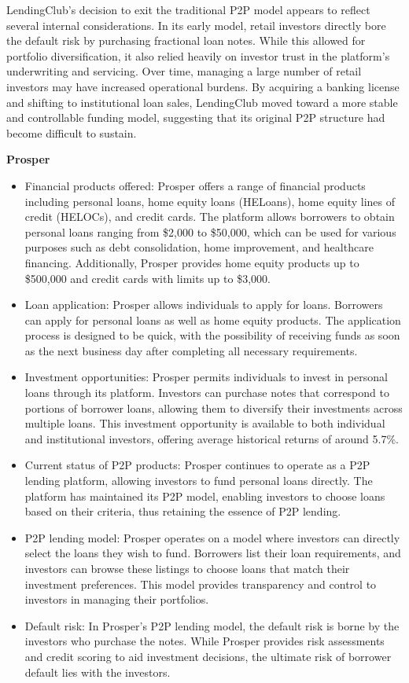 \documentclass[pdflatex,sn-apa]{sn-jnl}%
\theoremstyle{thmstyleone}%
\theoremstyle{thmstyletwo}%
\theoremstyle{thmstylethree}%
\begin{document}
LendingClub’s decision to exit the traditional P2P model appears to reflect several internal considerations. In its early model, retail investors directly bore the default risk by purchasing fractional loan notes. While this allowed for portfolio diversification, it also relied heavily on investor trust in the platform’s underwriting and servicing. Over time, managing a large number of retail investors may have increased operational burdens. By acquiring a banking license and shifting to institutional loan sales, LendingClub moved toward a more stable and controllable funding model, suggesting that its original P2P structure had become difficult to sustain.

\vspace{1\baselineskip}
\textbf{Prosper}
\begin{itemize} 
\item Financial products offered: Prosper offers a range of financial products including personal loans, home equity loans (HELoans), home equity lines of credit (HELOCs), and credit cards. The platform allows borrowers to obtain personal loans ranging from \$2,000 to \$50,000, which can be used for various purposes such as debt consolidation, home improvement, and healthcare financing. Additionally, Prosper provides home equity products up to \$500,000 and credit cards with limits up to \$3,000.
\item Loan application: Prosper allows individuals to apply for loans. Borrowers can apply for personal loans as well as home equity products. The application process is designed to be quick, with the possibility of receiving funds as soon as the next business day after completing all necessary requirements.
\item Investment opportunities: Prosper permits individuals to invest in personal loans through its platform. Investors can purchase notes that correspond to portions of borrower loans, allowing them to diversify their investments across multiple loans. This investment opportunity is available to both individual and institutional investors, offering average historical returns of around 5.7\%.
\item Current status of P2P products: Prosper continues to operate as a P2P lending platform, allowing investors to fund personal loans directly. The platform has maintained its P2P model, enabling investors to choose loans based on their criteria, thus retaining the essence of P2P lending.
\item P2P lending model: Prosper operates on a model where investors can directly select the loans they wish to fund. Borrowers list their loan requirements, and investors can browse these listings to choose loans that match their investment preferences. This model provides transparency and control to investors in managing their portfolios.
\item Default risk: In Prosper’s P2P lending model, the default risk is borne by the investors who purchase the notes. While Prosper provides risk assessments and credit scoring to aid investment decisions, the ultimate risk of borrower default lies with the investors.
\end{itemize}
\end{document}
